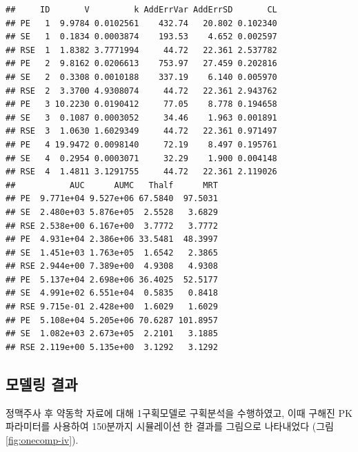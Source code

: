 \documentclass[
  11pt,
  krantz2, a4paper, twoside]{krantz}
\theoremstyle{definition}
\theoremstyle{definition}
\theoremstyle{definition}
\theoremstyle{definition}
\theoremstyle{remark}
\begin{document}
\begin{verbatim}
##     ID       V         k AddErrVar AddErrSD       CL
## PE   1  9.9784 0.0102561    432.74   20.802 0.102340
## SE   1  0.1834 0.0003874    193.53    4.652 0.002597
## RSE  1  1.8382 3.7771994     44.72   22.361 2.537782
## PE   2  9.8162 0.0206613    753.97   27.459 0.202816
## SE   2  0.3308 0.0010188    337.19    6.140 0.005970
## RSE  2  3.3700 4.9308074     44.72   22.361 2.943762
## PE   3 10.2230 0.0190412     77.05    8.778 0.194658
## SE   3  0.1087 0.0003052     34.46    1.963 0.001891
## RSE  3  1.0630 1.6029349     44.72   22.361 0.971497
## PE   4 19.9472 0.0098140     72.19    8.497 0.195761
## SE   4  0.2954 0.0003071     32.29    1.900 0.004148
## RSE  4  1.4811 3.1291755     44.72   22.361 2.119026
##           AUC      AUMC   Thalf      MRT
## PE  9.771e+04 9.527e+06 67.5840  97.5031
## SE  2.480e+03 5.876e+05  2.5528   3.6829
## RSE 2.538e+00 6.167e+00  3.7772   3.7772
## PE  4.931e+04 2.386e+06 33.5481  48.3997
## SE  1.451e+03 1.763e+05  1.6542   2.3865
## RSE 2.944e+00 7.389e+00  4.9308   4.9308
## PE  5.137e+04 2.698e+06 36.4025  52.5177
## SE  4.991e+02 6.551e+04  0.5835   0.8418
## RSE 9.715e-01 2.428e+00  1.6029   1.6029
## PE  5.108e+04 5.205e+06 70.6287 101.8957
## SE  1.082e+03 2.673e+05  2.2101   3.1885
## RSE 2.119e+00 5.135e+00  3.1292   3.1292
\end{verbatim}

\hypertarget{uxbaa8uxb378uxb9c1-uxacb0uxacfc-1}{%
\subsection{모델링 결과}\label{uxbaa8uxb378uxb9c1-uxacb0uxacfc-1}}

정맥주사 후 약동학 자료에 대해 1구획모델로 구획분석을 수행하였고, 이때 구해진 PK 파라미터를 사용하여 150분까지 시뮬레이션 한 결과를 그림으로 나타내었다 (그림 \ref{fig:onecomp-iv}). 
\end{document}
